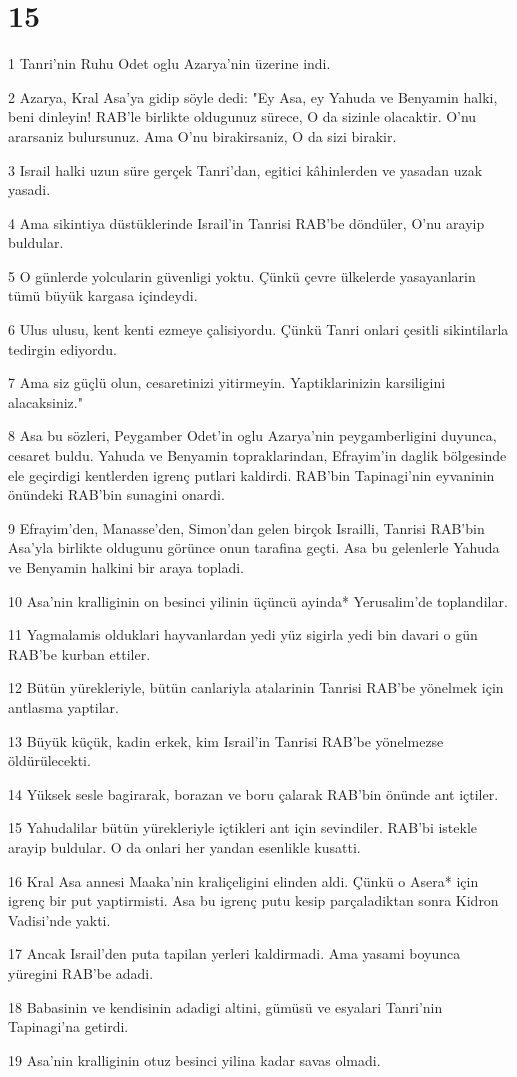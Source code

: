 \chapter{15}

\par 1 Tanri'nin Ruhu Odet oglu Azarya'nin üzerine indi.
\par 2 Azarya, Kral Asa'ya gidip söyle dedi: "Ey Asa, ey Yahuda ve Benyamin halki, beni dinleyin! RAB'le birlikte oldugunuz sürece, O da sizinle olacaktir. O'nu ararsaniz bulursunuz. Ama O'nu birakirsaniz, O da sizi birakir.
\par 3 Israil halki uzun süre gerçek Tanri'dan, egitici kâhinlerden ve yasadan uzak yasadi.
\par 4 Ama sikintiya düstüklerinde Israil'in Tanrisi RAB'be döndüler, O'nu arayip buldular.
\par 5 O günlerde yolcularin güvenligi yoktu. Çünkü çevre ülkelerde yasayanlarin tümü büyük kargasa içindeydi.
\par 6 Ulus ulusu, kent kenti ezmeye çalisiyordu. Çünkü Tanri onlari çesitli sikintilarla tedirgin ediyordu.
\par 7 Ama siz güçlü olun, cesaretinizi yitirmeyin. Yaptiklarinizin karsiligini alacaksiniz."
\par 8 Asa bu sözleri, Peygamber Odet'in oglu Azarya'nin peygamberligini duyunca, cesaret buldu. Yahuda ve Benyamin topraklarindan, Efrayim'in daglik bölgesinde ele geçirdigi kentlerden igrenç putlari kaldirdi. RAB'bin Tapinagi'nin eyvaninin önündeki RAB'bin sunagini onardi.
\par 9 Efrayim'den, Manasse'den, Simon'dan gelen birçok Israilli, Tanrisi RAB'bin Asa'yla birlikte oldugunu görünce onun tarafina geçti. Asa bu gelenlerle Yahuda ve Benyamin halkini bir araya topladi.
\par 10 Asa'nin kralliginin on besinci yilinin üçüncü ayinda* Yerusalim'de toplandilar.
\par 11 Yagmalamis olduklari hayvanlardan yedi yüz sigirla yedi bin davari o gün RAB'be kurban ettiler.
\par 12 Bütün yürekleriyle, bütün canlariyla atalarinin Tanrisi RAB'be yönelmek için antlasma yaptilar.
\par 13 Büyük küçük, kadin erkek, kim Israil'in Tanrisi RAB'be yönelmezse öldürülecekti.
\par 14 Yüksek sesle bagirarak, borazan ve boru çalarak RAB'bin önünde ant içtiler.
\par 15 Yahudalilar bütün yürekleriyle içtikleri ant için sevindiler. RAB'bi istekle arayip buldular. O da onlari her yandan esenlikle kusatti.
\par 16 Kral Asa annesi Maaka'nin kraliçeligini elinden aldi. Çünkü o Asera* için igrenç bir put yaptirmisti. Asa bu igrenç putu kesip parçaladiktan sonra Kidron Vadisi'nde yakti.
\par 17 Ancak Israil'den puta tapilan yerleri kaldirmadi. Ama yasami boyunca yüregini RAB'be adadi.
\par 18 Babasinin ve kendisinin adadigi altini, gümüsü ve esyalari Tanri'nin Tapinagi'na getirdi.
\par 19 Asa'nin kralliginin otuz besinci yilina kadar savas olmadi.

